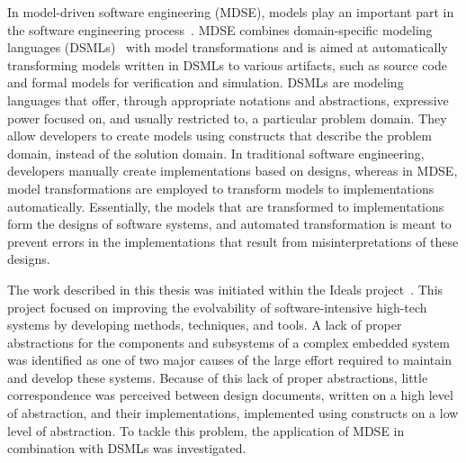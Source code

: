 In model-driven software engineering (MDSE), models play an important part in the software engineering process~\cite{Schmidt2006}.
MDSE combines domain-specific modeling languages (DSMLs)~\cite{Deursen2000} with model transformations and is aimed at automatically transforming models written in DSMLs to various artifacts,
such as source code and formal models for verification and simulation.
DSMLs are modeling languages that offer, through appropriate notations and abstractions, expressive power focused on, and usually restricted to, a particular problem domain.
They allow developers to create models using constructs that describe the problem domain, instead of the solution domain.
In traditional software engineering, developers manually create implementations based on designs, whereas in MDSE, model transformations are employed to transform models to implementations automatically.
Essentially, the models that are transformed to implementations form the designs of software systems,
and automated transformation is meant to prevent errors in the implementations that result from misinterpretations of these designs.

The work described in this thesis was initiated within the Ideals project~\cite{Ideals2007}.
This project focused on improving the evolvability of software-intensive high-tech systems by developing methods, techniques, and tools.
A lack of proper abstractions for the components and subsystems of a complex embedded system was identified as one of two major causes of the large effort required to maintain and develop these systems.
Because of this lack of proper abstractions, little correspondence was perceived between design documents, written on a high level of abstraction, and their implementations, implemented using constructs on a low level of abstraction.
To tackle this problem, the application of MDSE in combination with DSMLs was investigated.

